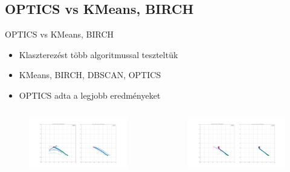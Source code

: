 \documentclass{beamer}
\begin{document}
\subsection{OPTICS vs KMeans, BIRCH}
\begin{frame}{OPTICS vs KMeans, BIRCH}
    \begin{itemize}
        \item Klaszterezést több algoritmussal teszteltük
        \item KMeans, BIRCH, DBSCAN, OPTICS
        \item OPTICS adta a legjobb eredményeket
    \end{itemize}
    \begin{columns}
        \begin{figure}
            \includegraphics[scale=0.08]{../bad_clustering/example_kmeans_vs_optics.png}
        \end{figure}
        \begin{figure}
            \includegraphics[scale=0.08]{../bad_clustering/example_birch_vs_optics.png}
        \end{figure}
    \end{columns}
\end{frame}
\end{document}
